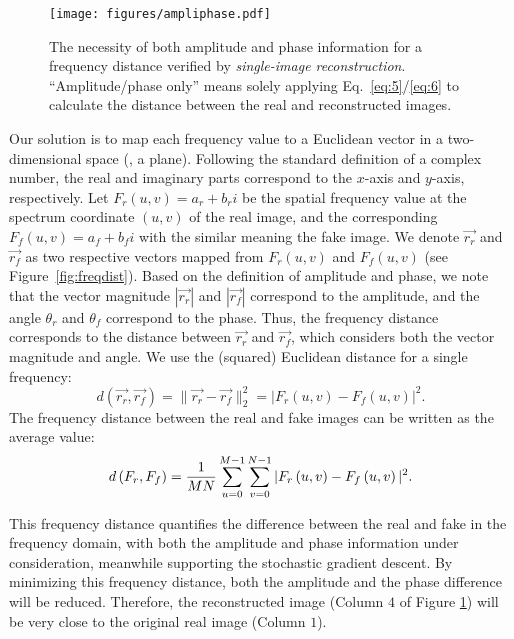 \documentclass[10pt,twocolumn,letterpaper]{article}
\begin{document}
\begin{figure}[t]
	\centering
\texttt{[image: figures/ampliphase.pdf]}
\caption{The necessity of both amplitude and phase information for a frequency distance verified by \textit{single-image reconstruction}. ``Amplitude/phase only'' means solely applying Eq.~\eqref{eq:5}/\eqref{eq:6} to calculate the distance between the real and reconstructed images.}
	\label{fig:ampliphase}
	\vspace{-0.3cm}
\end{figure}




Our solution is to map each frequency value to a Euclidean vector in a two-dimensional space (\ie, a plane). Following the standard definition of a complex number, the real and imaginary parts correspond to the $x$-axis and $y$-axis, respectively.
Let $F_r\left(u,v\right)=a_r+b_ri$ be the spatial frequency value at the spectrum coordinate $\left(u,v\right)$ of the real image, and the corresponding $F_f\left(u,v\right)=a_f+b_fi$ with the similar meaning \wrt the fake image.
We denote $\vec{r_r}$ and $\vec{r_f}$ as two respective vectors mapped from $F_r\left(u,v\right)$ and $F_f\left(u,v\right)$ (see Figure~\ref{fig:freqdist}).
Based on the definition of amplitude and phase, we note that the vector magnitude $|\vec{r_r}|$ and $|\vec{r_f}|$ correspond to the amplitude, and the angle $\theta_r$ and $\theta_f$ correspond to the phase.
Thus, the frequency distance corresponds to the distance between $\vec{r_r}$ and $\vec{r_f}$, which considers both the vector magnitude and angle.
We use the (squared) Euclidean distance for a single frequency:
\begin{equation}
\label{eq:7}
    d\left(\vec{r_r},\vec{r_f}\right)=\|\vec{r_r}-\vec{r_f}\|_2^2=|F_r\left(u,v\right)-F_f\left(u,v\right)|^2.
\end{equation}
The frequency distance between the real and fake images can be written as the average value: 
\begin{equation}
\small
\label{eq:8}
    d\left(F_r,F_f\right)=\frac{1}{MN}\sum_{u=0}^{M-1}\sum_{v=0}^{N-1}{|F_r\left(u,v\right)-F_f\left(u,v\right)|^2}.
\end{equation}


This frequency distance quantifies the difference between the real and fake in the frequency domain, with both the amplitude and phase information under consideration, meanwhile supporting the stochastic gradient descent.
By minimizing this frequency distance, both the amplitude and the phase difference will be reduced. Therefore, the reconstructed image (Column $4$ of Figure \ref{fig:ampliphase}) will be very close to the original real image (Column $1$).
\fi
\end{document}
